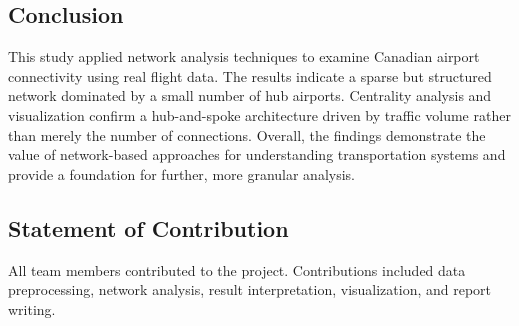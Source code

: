 \documentclass{article}
\begin{document}
\subsection{Conclusion}

This study applied network analysis techniques to examine Canadian airport connectivity using real flight data. The results indicate a sparse but structured network dominated by a small number of hub airports. Centrality analysis and visualization confirm a hub-and-spoke architecture driven by traffic volume rather than merely the number of connections. Overall, the findings demonstrate the value of network-based approaches for understanding transportation systems and provide a foundation for further, more granular analysis.

\subsection*{Statement of Contribution}
All team members contributed to the project. Contributions included data preprocessing, network analysis, result interpretation, visualization, and report writing.
\end{document}

